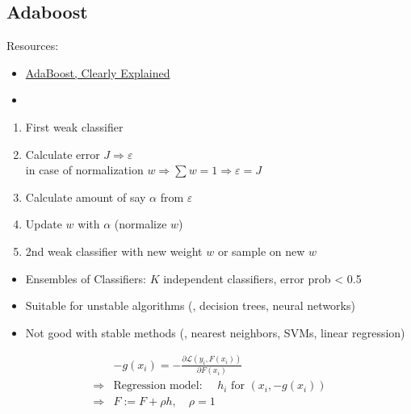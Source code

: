 \subsection{Adaboost}
Resources:
\begin{itemize}
	\item \href{https://youtu.be/LsK-xG1cLYA}{AdaBoost, Clearly Explained}
	\item 
\end{itemize}

\begin{enumerate}
	\item First weak classifier
	\item Calculate error $J \Rightarrow \varepsilon$\\
	in case of normalization $w \Rightarrow \sum w = 1 \Rightarrow \varepsilon = J$
	\item Calculate amount of say $\alpha$ from $\varepsilon$
	\item Update $w$ with $\alpha$ (normalize $w$)
	\item 2nd weak classifier with new weight $w$ or sample on new $w$
\end{enumerate}

\begin{itemize}
	\item Ensembles of Classifiers: $K$ independent classifiers, error \ac{prob} < 0.5
	\item Suitable for unstable algorithms (\ie, decision trees, neural networks)
	\item Not good with stable methods (\ie, nearest neighbors, \ac{SVM}s, linear regression)
\end{itemize}

\begin{align}
	& -g(x_i) = -\frac{\partial \mathcal{L} (y_i, F(x_i))}{\partial F(x_i)} \\
	\Rightarrow & \text{Regression model: } \quad h_i \text{ for } (x_i, -g(x_i))\\
	\Rightarrow & F:= F + \rho h, \quad \rho = 1
\end{align}

